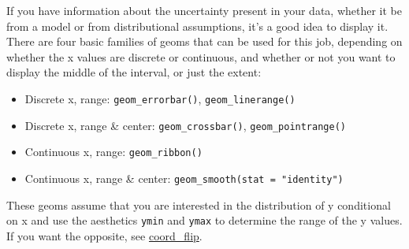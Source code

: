 
If you have information about the uncertainty present in your data,
whether it be from a model or from distributional assumptions, it's a
good idea to display it. There are four basic families of geoms that can
be used for this job, depending on whether the x values are discrete or
continuous, and whether or not you want to display the middle of the
interval, or just the extent:

\begin{itemize}
\tightlist
\item
  Discrete x, range: \texttt{geom\_errorbar()},
  \texttt{geom\_linerange()}
\item
  Discrete x, range \& center: \texttt{geom\_crossbar()},
  \texttt{geom\_pointrange()}
\item
  Continuous x, range: \texttt{geom\_ribbon()}
\item
  Continuous x, range \& center:
  \texttt{geom\_smooth(stat\ =\ "identity")}
\end{itemize}

These geoms assume that you are interested in the distribution of y
conditional on x and use the aesthetics \texttt{ymin} and \texttt{ymax}
to determine the range of the y values. If you want the opposite, see
\hyperref[sub:coord-flip]{coord\_flip}. 
  
 

\begin{Shaded}
\begin{Highlighting}[]
\StringTok{ }\NormalTok{(}\NormalTok{, }\NormalTok{, }\NormalTok{)}
\StringTok{ }\NormalTok{(} \NormalTok{:}\NormalTok{, }  \NormalTok{(}\NormalTok{, }\NormalTok{, }\NormalTok{))}

\StringTok{ } \StringTok{ } \StringTok{ }
\StringTok{ }\NormalTok{()}
\StringTok{ }\NormalTok{()}
\StringTok{ }\NormalTok{(} \NormalTok{)}
\end{Highlighting}
\end{Shaded}

